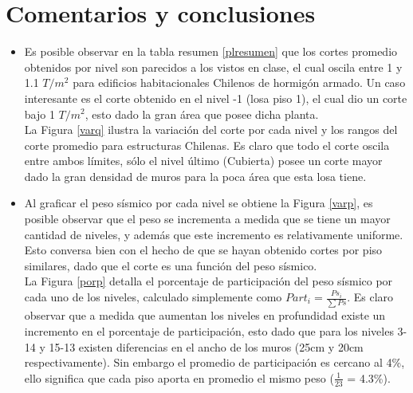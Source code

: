 \documentclass[letterpaper,11pt]{article} %
\begin{document}
\newpage
\section{Comentarios y conclusiones}

\begin{itemize}
    \item Es posible observar en la tabla resumen \ref{plresumen} que los cortes promedio obtenidos por nivel son parecidos a los vistos en clase, el cual oscila entre 1 y 1.1 $T/m^2$ para edificios habitacionales Chilenos de hormigón armado. Un caso interesante es el corte obtenido en el nivel -1 (losa piso 1), el cual dio un corte bajo 1 $T/m^2$, esto dado la gran área que posee dicha planta. \\
    
    La Figura \ref{varq} ilustra la variación del corte por cada nivel y los rangos del corte promedio para estructuras Chilenas. Es claro que todo el corte oscila entre ambos límites, sólo el nivel último (Cubierta) posee un corte mayor dado la gran densidad de muros para la poca área que esta losa tiene.
    
    
    \item Al graficar el peso sísmico por cada nivel se obtiene la Figura \ref{varp}, es posible observar que el peso se incrementa a medida que se tiene un mayor cantidad de niveles, y además que este incremento es relativamente uniforme. Esto conversa bien con el hecho de que se hayan obtenido cortes por piso similares, dado que el corte es una función del peso sísmico. \\
    
    La Figura \ref{porp} detalla el porcentaje de participación del peso sísmico por cada uno de los niveles, calculado simplemente como $Part_i = \frac{Ps_i}{\sum Ps}$. Es claro observar que a medida que aumentan los niveles en profundidad existe un incremento en el porcentaje de participación, esto dado que para los niveles 3-14 y 15-13 existen diferencias en el ancho de los muros (25cm y 20cm respectivamente). Sin embargo el promedio de participación es cercano al 4\%, ello significa que cada piso aporta en promedio el mismo peso ($\frac{1}{23}$ = 4.3\%).
    

\end{itemize}
\end{document}
